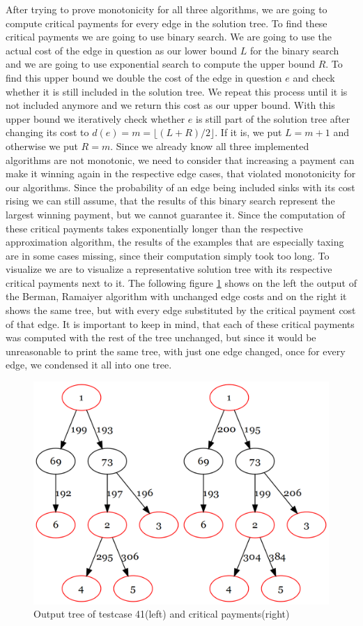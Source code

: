 After trying to prove monotonicity for all three algorithms, we are going to compute critical payments for every edge in the solution tree. To find these critical payments we are going to use binary search. We are going to use the actual cost of the edge in question as our lower bound $L$ for the binary search and we are going to use exponential search to compute the upper bound $R$. 
To find this upper bound we double the cost of the edge in question $e$ and check whether it is still included in the solution tree. We repeat this process until it is not included anymore and we return this cost as our upper bound. With this upper bound we iteratively check whether $e$ is still part of the solution tree after changing its cost to $d(e)=m=\lfloor (L+R)/2\rfloor$. If it is, we put $L=m+1$ and otherwise we put $R=m$. Since we already know all three implemented algorithms are not monotonic, we need to consider that increasing a payment can make it winning again in the respective edge cases, that violated monotonicity for our algorithms. Since the probability of an edge being included sinks with its cost rising we can still assume, that the results of this binary search represent  the largest winning payment, but we cannot guarantee it. Since the computation of these critical payments takes exponentially longer than the respective approximation algorithm, the results of the examples that are especially taxing are in some cases missing, since their computation simply took too long. To visualize we are to visualize a representative solution tree with its respective critical payments next to it. The following figure \ref{fig:crit41} shows on the left the output of the Berman, Ramaiyer algorithm with unchanged edge costs and on the right it shows the same tree, but with every edge substituted by the critical payment cost of that edge. It is important to keep in mind, that each of these critical payments was computed with the rest of the tree unchanged, but since it would be unreasonable to print the same tree, with just one edge changed, once for every edge, we condensed it all into one tree. 

\begin{figure}[h]
\centering
\includegraphics[scale=0.25]{figures/crit.png}
\caption{Output tree of testcase 41(left) and critical payments(right)}\label{fig:crit41}
\end{figure}
 
